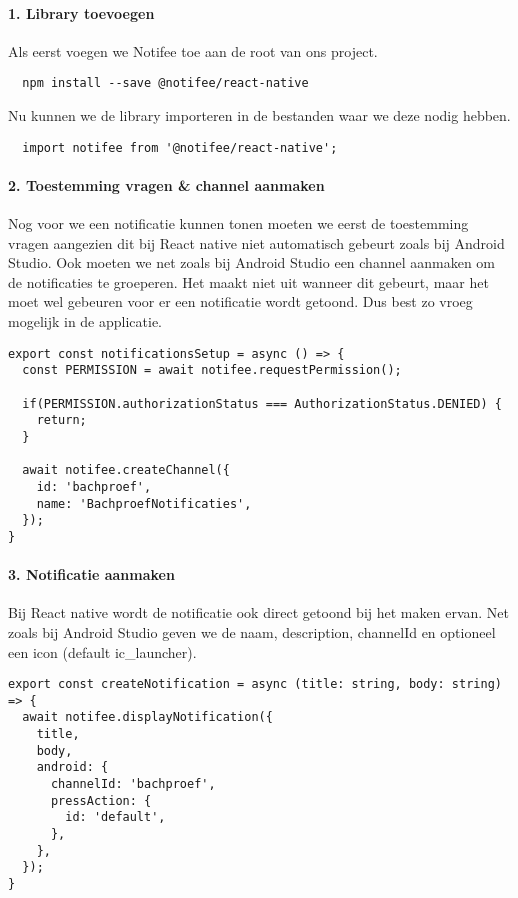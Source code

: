 \paragraph{1. Library toevoegen}
Als eerst voegen we Notifee toe aan de root van ons project.
\begin{verbatim}
  npm install --save @notifee/react-native
\end{verbatim}
Nu kunnen we de library importeren in de bestanden waar we deze nodig hebben.
\begin{verbatim}
  import notifee from '@notifee/react-native';
\end{verbatim}

\paragraph{2. Toestemming vragen \& channel aanmaken}
Nog voor we een notificatie kunnen tonen moeten we eerst de toestemming vragen aangezien dit bij React native 
niet automatisch gebeurt zoals bij Android Studio. Ook moeten we net zoals bij Android Studio 
een channel aanmaken om de notificaties te groeperen. Het maakt niet uit wanneer dit gebeurt, maar 
het moet wel gebeuren voor er een notificatie wordt getoond. Dus best zo vroeg mogelijk in de applicatie.
\begin{verbatim}
export const notificationsSetup = async () => {
  const PERMISSION = await notifee.requestPermission();

  if(PERMISSION.authorizationStatus === AuthorizationStatus.DENIED) {
    return;
  }

  await notifee.createChannel({
    id: 'bachproef',
    name: 'BachproefNotificaties',
  });
}

\end{verbatim}

\paragraph{3. Notificatie aanmaken}
Bij React native wordt de notificatie ook direct getoond bij het maken ervan. Net zoals bij Android Studio 
geven we de naam, description, channelId en optioneel een icon (default ic\_launcher). 
\begin{verbatim}
export const createNotification = async (title: string, body: string) => {
  await notifee.displayNotification({
    title,
    body,
    android: {
      channelId: 'bachproef',
      pressAction: {
        id: 'default',
      },
    },
  });
}
\end{verbatim}

